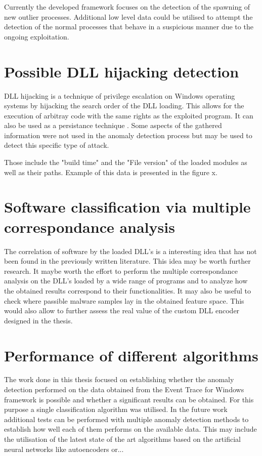 \documentclass[a4paper,twoside,12pt]{book}
\begin{document}
Currently the developed framework focuses on the detection of the spawning of new outlier processes.
Additional low level data could be utilised to attempt the detection of the normal processes that behave
in a suspicious manner due to the ongoing exploitation.

\section{Possible DLL hijacking detection}

DLL hijacking is a technique of privilege escalation on Windows operating systems by hijacking the 
search order of the DLL loading. This allows for the execution of arbitray code with the same rights 
as the exploited program. It can also be used as a persistance technique \cite{bib:DLLhijacking}.
Some aspects of the gathered information were not used in the anomaly detection process but may be
used to detect this specific type of attack. 

Those include the "build time" and the "File version" of the loaded modules as well as their paths.
Example of this data is presented in the figure x.

\section{Software classification via multiple correspondance analysis}

The correlation of software by the loaded DLL's is a interesting idea that has not been
found in the previously written literature. This idea may be worth further research. It maybe worth
the effort to perform the multiple correspondance analysis on the DLL's loaded by a wide range 
of programs and to analyze how the obtained results correspond to their functionalities. It may also
be useful to check where passible malware samples lay in the obtained feature space. This would also
allow to further assess the real value of the custom DLL encoder designed in the thesis. 

\section{Performance of different algorithms}

The work done in this thesis focused on establishing whether the anomaly detection performed on the
data obtained from the Event Trace for Windows framework is possible and whether a significant results
can be obtained. For this purpose a single classification algorithm was utilised. In the future work 
additional tests can be performed with multiple anomaly detection methods to establish how well each 
of them performs on the available data. This may include the utilisation of the latest state of the 
art algorithms based on the artificial neural networks like autoencoders or...
\end{document}
